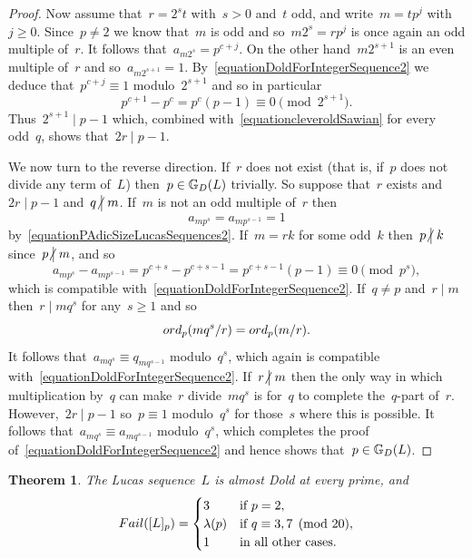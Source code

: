 \documentclass[10pt,a4paper]{amsart}
\numberwithin{equation}{section} %
\newtheorem{theorem}[thm]{Theorem}
\numberwithin{table}{section} %
\numberwithin{figure}{section}
\def\gooddoldprimes{\mathbb{G}_{\rm{D}}}
\newcommand\ord{{\rm{ord}}}
\newcommand\failure{{\rm{Fail}}}
\newcommand\notdivides{\mathrel{\kern-3pt\not\!\kern4.3pt\bigm|}}
\newcommand\divides\mid
\def\ge{\geqslant}
\begin{document}
\begin{proof}
Now assume that~$r=2^st$ with~$s>0$ and~$t$ odd,
and write~$m=tp^j$ with~$j\ge0$. Since~$p\neq2$
we know that~$m$ is odd and so~$m2^s=rp^j$ is
once again an odd multiple of~$r$.
It follows that~$a_{m2^s}=p^{c+j}$.
On the other hand~$m2^{s+1}$ is an even multiple
of~$r$ and so~$a_{m2^{s+1}}=1$. By~\eqref{equationDoldForIntegerSequence2}
we deduce that~$p^{c+j}\equiv1$ modulo~$2^{s+1}$
and so in particular
\[
p^{c+1}-p^c=p^c(p-1)\equiv0\pmod{2^{s+1}}.
\]
Thus~$2^{s+1}\divides p-1$ which, combined
with~\eqref{equationcleveroldSawian} for every odd~$q$,
shows that~$2r\divides p-1$.

We now turn to the reverse direction.
If~$r$ does not exist (that is, if~$p$ does not divide
any term of~$L$) then~$p\in\gooddoldprimes(L)$
trivially. So suppose that~$r$ exists and~$2r\divides p-1$
and~$q\notdivides m$.
If~$m$ is not an odd multiple of~$r$ then
\[
a_{mp^s}=a_{mp^{s-1}}=1
\]
by~\eqref{equationPAdicSizeLucasSequences2}.
If~$m=rk$ for some odd~$k$ then~$p\notdivides k$ since~$p\notdivides m$,
and so
\[
a_{mp^s}-a_{mp^{s-1}}=p^{c+s}-p^{c+s-1}=p^{c+s-1}(p-1)\equiv0\pmod{p^s},
\]
which is compatible
with~\eqref{equationDoldForIntegerSequence2}.
If~$q\neq p$ and~$r\divides m$ then~$r\divides mq^s$ for any~$s\ge1$
and so
\[
\ord_{p}(mq^s/r)=\ord_p(m/r).
\]
It follows that~$a_{mq^s}\equiv q_{mq^{s-1}}$ modulo~$q^s$,
which again is compatible with~\eqref{equationDoldForIntegerSequence2}.
If~$r\notdivides m$ then the only way in which multiplication
by~$q$ can make~$r$ divide~$mq^s$ is for~$q$ to complete
the~$q$-part of~$r$. However,~$2r\divides p-1$ so~$p\equiv1$
modulo~$q^s$ for those~$s$ where this is possible.
It follows that~$a_{mq^s}\equiv a_{mq^{s-1}}$ modulo~$q^s$,
which completes the proof of~\eqref{equationDoldForIntegerSequence2}
and hence shows that~$p\in\gooddoldprimes(L)$.
\end{proof}



\begin{theorem}\label{theoremLucas}
The Lucas sequence~$L$ is almost Dold at every
prime, and
\[
\failure([L]_p)
=
\begin{cases}
3&\mbox{if }p=2,\\
\lambda(p)&\mbox{if }q\equiv3,7\pmod{20},\\
1&\mbox{in all other cases}.
\end{cases}
\]
\end{theorem}
\end{document}
